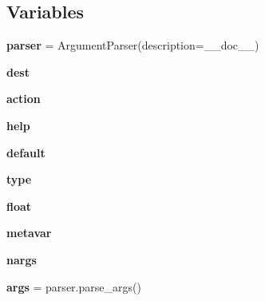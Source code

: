 \subsection*{Variables}
\begin{DoxyCompactItemize}
\item 
\mbox{\label{namespacepymavlink_1_1tools_1_1magfit__rotation__gps_a428a13eb926699f2a21c646f932abe87}} 
{\bfseries parser} = Argument\+Parser(description=\+\_\+\+\_\+doc\+\_\+\+\_\+)
\item 
\mbox{\label{namespacepymavlink_1_1tools_1_1magfit__rotation__gps_afaf127ac28c903fb18314938ec0f59a1}} 
{\bfseries dest}
\item 
\mbox{\label{namespacepymavlink_1_1tools_1_1magfit__rotation__gps_a2317bac69bbddd888f5ad8d03ea7ecce}} 
{\bfseries action}
\item 
\mbox{\label{namespacepymavlink_1_1tools_1_1magfit__rotation__gps_aff6395a9045de76470c0963001156966}} 
{\bfseries help}
\item 
\mbox{\label{namespacepymavlink_1_1tools_1_1magfit__rotation__gps_ac19614925535ea788283ac619a889d9a}} 
{\bfseries default}
\item 
\mbox{\label{namespacepymavlink_1_1tools_1_1magfit__rotation__gps_a61985719996fb8a202a94859c3440059}} 
{\bfseries type}
\item 
\mbox{\label{namespacepymavlink_1_1tools_1_1magfit__rotation__gps_a1ce20c7769670131a8c44840a4ff00b8}} 
{\bfseries float}
\item 
\mbox{\label{namespacepymavlink_1_1tools_1_1magfit__rotation__gps_a8ea8d5b66514c164d1ae88732aa37837}} 
{\bfseries metavar}
\item 
\mbox{\label{namespacepymavlink_1_1tools_1_1magfit__rotation__gps_ad7b88328804d94afb41eb71573f293ac}} 
{\bfseries nargs}
\item 
\mbox{\label{namespacepymavlink_1_1tools_1_1magfit__rotation__gps_a546c94a82143c99db429ae0da7b23f1e}} 
{\bfseries args} = parser.\+parse\+\_\+args()
\end{DoxyCompactItemize}


